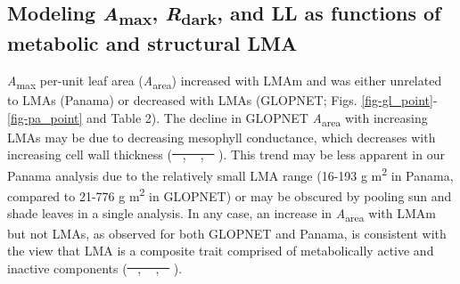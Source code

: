 \documentclass[
  12pt,
  letterpaper,
  DIV=11,
  numbers=noendperiod]{scrartcl}
\providecommand{\DIFadd}[1]{{\protect\color{blue}\uwave{#1}}} %
\providecommand{\DIFdel}[1]{{\protect\color{red}\sout{#1}}}                      %
\providecommand{\DIFaddbegin}{} %
\providecommand{\DIFaddend}{} %
\providecommand{\DIFdelbegin}{} %
\providecommand{\DIFdelend}{} %
\newcommand{\DIFscaledelfig}{0.5}
\newlength{\DIFdelgraphicswidth} %
\newlength{\DIFdelgraphicsheight} %
\newcommand{\DIFaddincludegraphics}[2][]{{\color{blue}\fbox{\DIFOincludegraphics[#1]{#2}}}} %
\newcommand{\DIFdelincludegraphics}[2][]{%
\sbox{\DIFdelgraphicsbox}{\DIFOincludegraphics[#1]{#2}}%
\settoboxwidth{\DIFdelgraphicswidth}{\DIFdelgraphicsbox} %
\settoboxtotalheight{\DIFdelgraphicsheight}{\DIFdelgraphicsbox} %
\scalebox{\DIFscaledelfig}{%
\parbox[b]{\DIFdelgraphicswidth}{\usebox{\DIFdelgraphicsbox}\\[-\baselineskip] \rule{\DIFdelgraphicswidth}{0em}}\llap{\resizebox{\DIFdelgraphicswidth}{\DIFdelgraphicsheight}{%
\setlength{\unitlength}{\DIFdelgraphicswidth}%
\begin{picture}(1,1)%
\thicklines\linethickness{2pt} %
{\color[rgb]{1,0,0}\put(0,0){\framebox(1,1){}}}%
{\color[rgb]{1,0,0}\put(0,0){\line( 1,1){1}}}%
{\color[rgb]{1,0,0}\put(0,1){\line(1,-1){1}}}%
\end{picture}%
}\hspace*{3pt}}} %
} %
\DeclareRobustCommand{\DIFaddbegin}{\DIFOaddbegin \let\includegraphics\DIFaddincludegraphics} %
\DeclareRobustCommand{\DIFaddend}{\DIFOaddend \let\includegraphics\DIFOincludegraphics} %
\DeclareRobustCommand{\DIFdelbegin}{\DIFOdelbegin \let\includegraphics\DIFdelincludegraphics} %
\DeclareRobustCommand{\DIFdelend}{\DIFOaddend \let\includegraphics\DIFOincludegraphics} %
\begin{document}
\subsection{\texorpdfstring{Modeling \emph{A}\textsubscript{max},
\emph{R}\textsubscript{dark}, and LL as functions of metabolic and
structural
LMA}{Modeling Amax, Rdark, and LL as functions of metabolic and structural LMA}}\label{modeling-amax-rdark-and-ll-as-functions-of-metabolic-and-structural-lma}

\emph{A}\textsubscript{max} per-unit leaf area
(\emph{A}\textsubscript{area}) increased with LMAm and was either
unrelated to LMAs (Panama) or decreased with LMAs (GLOPNET; Figs.
\ref{fig-gl_point}-\ref{fig-pa_point} and Table 2). The decline in
GLOPNET \emph{A}\textsubscript{area} with increasing LMAs may be due to
decreasing mesophyll conductance, which decreases with increasing cell
wall thickness (\DIFdelbegin \DIFdel{\mbox{%
\citeproc{ref-Evans2009}{Evans et al. 2009}}\hspace{0pt}%
,
\mbox{%
\citeproc{ref-Terashima2011}{Terashima et al. 2011}}\hspace{0pt}%
,
\mbox{%
\citeproc{ref-Onoda2017}{Onoda et al. 2017}}\hspace{0pt}%
}\DIFdelend \DIFaddbegin \DIFadd{\mbox{%
\citeproc{ref-Evans2009}{Evans et al., 2009}}\hspace{0pt}%
;
\mbox{%
\citeproc{ref-Onoda2017}{Onoda et al., 2017}}\hspace{0pt}%
;
\mbox{%
\citeproc{ref-Terashima2011}{Terashima et al., 2011}}\hspace{0pt}%
}\DIFaddend ). This trend may be
less apparent in our Panama analysis due to the relatively small LMA
range (16-193 g m\textsuperscript{2} in Panama, compared to 21-776 g
m\textsuperscript{2} in GLOPNET) or may be obscured by pooling sun and
shade leaves in a single analysis. In any case, an increase in
\emph{A}\textsubscript{area} with LMAm but not LMAs, as observed for
both GLOPNET and Panama, is consistent with the view that LMA is a
composite trait comprised of metabolically active and inactive
components (\DIFdelbegin \DIFdel{\mbox{%
\citeproc{ref-Poorter2009}{Poorter et al. 2009}}\hspace{0pt}%
,
\mbox{%
\citeproc{ref-Osnas2018}{Osnas et al. 2018}}\hspace{0pt}%
,
\mbox{%
\citeproc{ref-Lichstein2021}{Lichstein et al. 2021}}\hspace{0pt}%
}\DIFdelend \DIFaddbegin \DIFadd{\mbox{%
\citeproc{ref-Lichstein2021}{Lichstein et al., 2021}}\hspace{0pt}%
;
\mbox{%
\citeproc{ref-Osnas2018}{Osnas et al., 2018}}\hspace{0pt}%
;
\mbox{%
\citeproc{ref-Poorter2009}{Poorter et al., 2009}}\hspace{0pt}%
}\DIFaddend ).
\end{document}
